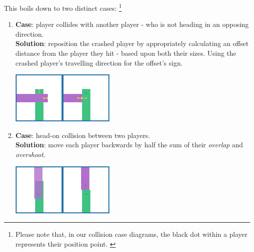 \documentclass{standalone}
\begin{document}
			This boils down to two distinct cases: \footnote{Please note that, in our collision case diagrams, the black dot within a player represents their position point. \label{blackDotDiagram}}
			\begin{enumerate}
    		\item
    			\textbf{Case}: player collides with another player - who is not heading in an opposing direction.\\
					\textbf{Solution}: reposition the crashed player by appropriately calculating an offset distance from the player they hit - based upon both their sizes. Using the crashed player's travelling direction for the offset's sign. \\
					\begin{minipage}{\linewidth}
						\centering
						\captionsetup{width=.8\linewidth}
	          \includegraphics[width=.8\linewidth]{resources/images/collision/side.png}%
	    		\end{minipage}
				\item \label{itm:headCollision}
					\textbf{Case}: head-on collision between two players.\\
					\textbf{Solution}: move each player backwards by half the sum of their \emph{overlap} and \emph{overshoot}.\\
					\begin{minipage}{\linewidth}
						\centering
						\captionsetup{width=.8\linewidth}
	          \includegraphics[width=.8\linewidth]{resources/images/collision/headon.png}%
	    		\end{minipage}
			\end{enumerate}
\end{document}
